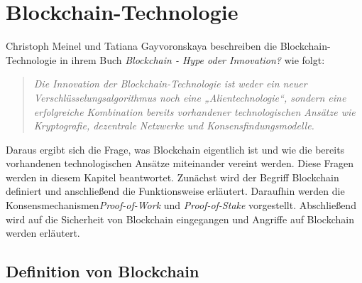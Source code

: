 \section{Blockchain-Technologie}
\label{sec:blockchain_basics}


Christoph Meinel und Tatiana Gayvoronskaya beschreiben die Blockchain-Technologie in ihrem Buch \textit{Blockchain - Hype oder Innovation?} wie folgt:

\begin{quote}
    \textit{Die Innovation der Blockchain-Technologie ist weder ein neuer Verschlüsselungsalgorithmus
    noch eine „Alientechnologie“, sondern eine erfolgreiche Kombination bereits
    vorhandener technologischen Ansätze wie Kryptografie, dezentrale Netzwerke und Konsensfindungsmodelle.}\parencite[S. 17]{Meinel_BlockchainHypeInnovation}
\end{quote}

\noindent Daraus ergibt sich die Frage, was Blockchain eigentlich ist und wie die bereits vorhandenen technologischen Ansätze miteinander vereint werden. Diese Fragen werden in diesem Kapitel beantwortet. Zunächst wird der Begriff Blockchain definiert und anschließend die Funktionsweise erläutert. Daraufhin werden die Konsensmechanismen\textit{Proof-of-Work} und \textit{Proof-of-Stake} vorgestellt. Abschließend wird auf die Sicherheit von Blockchain eingegangen und Angriffe auf Blockchain werden erläutert.


\subsection{Definition von Blockchain}
\label{subsec:blockchain_definition}

